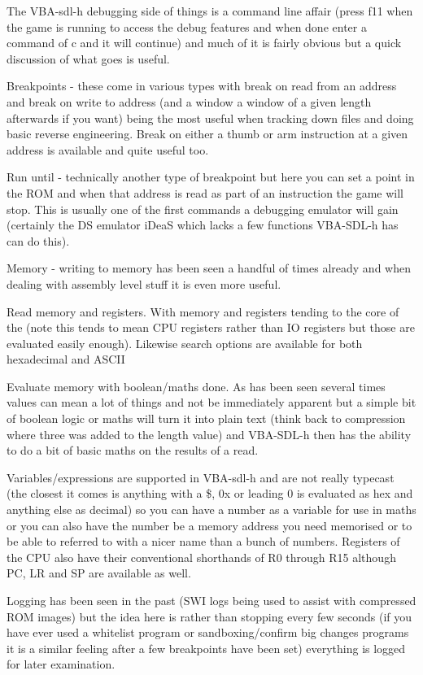 \documentclass[
]{book}
\begin{document}
The VBA-sdl-h debugging side of things is a command line affair (press f11 when the game is running to access the debug features and when done enter a command of c and it will continue) and much of it is fairly obvious but a quick discussion of what goes is useful.

Breakpoints - these come in various types with break on read from an address and break on write to address (and a window a window of a given length afterwards if you want) being the most useful when tracking down files and doing basic reverse engineering. Break on either a thumb or arm instruction at a given address is available and quite useful too.

Run until - technically another type of breakpoint but here you can set a point in the ROM and when that address is read as part of an instruction the game will stop. This is usually one of the first commands a debugging emulator will gain (certainly the DS emulator iDeaS which lacks a few functions VBA-SDL-h has can do this).

Memory - writing to memory has been seen a handful of times already and when dealing with assembly level stuff it is even more useful.

Read memory and registers. With memory and registers tending to the core of the (note this tends to mean CPU registers rather than IO registers but those are evaluated easily enough). Likewise search options are available for both hexadecimal and ASCII

Evaluate memory with boolean/maths done. As has been seen several times values can mean a lot of things and not be immediately apparent but a simple bit of boolean logic or maths will turn it into plain text (think back to compression where three was added to the length value) and VBA-SDL-h then has the ability to do a bit of basic maths on the results of a read.

Variables/expressions are supported in VBA-sdl-h and are not really typecast (the closest it comes is anything with a \$, 0x or leading 0 is evaluated as hex and anything else as decimal) so you can have a number as a variable for use in maths or you can also have the number be a memory address you need memorised or to be able to referred to with a nicer name than a bunch of numbers. Registers of the CPU also have their conventional shorthands of R0 through R15 although PC, LR and SP are available as well.

Logging has been seen in the past (SWI logs being used to assist with compressed ROM images) but the idea here is rather than stopping every few seconds (if you have ever used a whitelist program or sandboxing/confirm big changes programs it is a similar feeling after a few breakpoints have been set) everything is logged for later examination.
\end{document}
